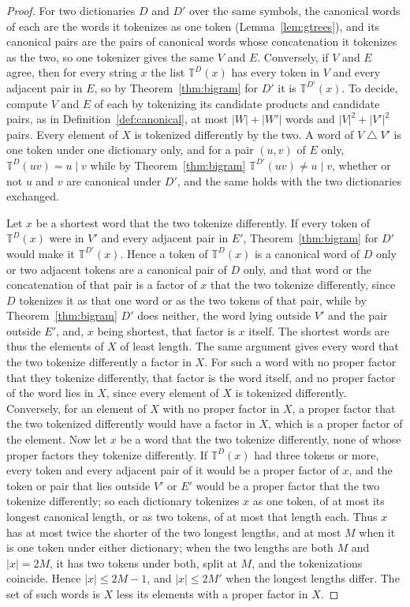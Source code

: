 \documentclass[11pt,a4paper]{article}
\theoremstyle{definition}
\theoremstyle{plain}
\newcommand{\T}{\mathbb{T}}
\begin{document}
\begin{proof}
For two dictionaries \(D\) and \(D'\) over the same symbols, the canonical words of each are the words it tokenizes as
one token (Lemma~\ref{lem:gtrees}), and its canonical pairs are the pairs of canonical words whose concatenation it
tokenizes as the two, so one tokenizer gives the same \(V\) and \(E\). Conversely, if \(V\) and \(E\) agree, then for
every string \(x\) the list \(\T^D(x)\) has every token in \(V\) and every adjacent pair in \(E\), so by
Theorem~\ref{thm:bigram} for \(D'\) it is \(\T^{D'}(x)\). To decide, compute \(V\) and \(E\) of each by tokenizing its
candidate products and candidate pairs, as in Definition~\ref{def:canonical}, at most \(|W| + |W'|\) words and
\(|V|^2 + |V'|^2\) pairs. Every element of \(X\) is tokenized differently by the two. A word of
\(V \mathbin{\triangle} V'\) is one token under one dictionary only, and for a pair \((u, v)\) of \(E\) only,
\(\T^D(uv) = u \mid v\) while by Theorem~\ref{thm:bigram} \(\T^{D'}(uv) \ne u \mid v\), whether or not \(u\) and \(v\)
are canonical under \(D'\), and the same holds with the two dictionaries exchanged.

Let \(x\) be a shortest word that the two tokenize differently. If every token of \(\T^D(x)\) were in \(V'\) and every
adjacent pair in \(E'\), Theorem~\ref{thm:bigram} for \(D'\) would make it \(\T^{D'}(x)\). Hence a token of \(\T^D(x)\)
is a canonical word of \(D\) only or two adjacent tokens are a canonical pair of \(D\) only, and that word or the
concatenation of that pair is a factor of \(x\) that the two tokenize differently, since \(D\) tokenizes it as that one
word or as the two tokens of that pair, while by Theorem~\ref{thm:bigram} \(D'\) does neither, the word lying outside
\(V'\) and the pair outside \(E'\), and, \(x\) being shortest, that factor is \(x\) itself. The shortest words are thus
the elements of \(X\) of least length. The same argument gives every word that the two tokenize differently a factor in
\(X\). For such a word with no proper factor that they tokenize differently, that factor is the word itself, and no
proper factor of the word lies in \(X\), since every element of \(X\) is tokenized differently. Conversely, for an
element of \(X\) with no proper factor in \(X\), a proper factor that the two tokenized differently would have a factor
in \(X\), which is a proper factor of the element. Now let \(x\) be a word that the two tokenize differently, none of
whose proper factors they tokenize differently. If \(\T^D(x)\) had three tokens or more, every token and every adjacent
pair of it would be a proper factor of \(x\), and the token or pair that lies outside \(V'\) or \(E'\) would be a proper
factor that the two tokenize differently; so each dictionary tokenizes \(x\) as one token, of at most its longest
canonical length, or as two tokens, of at most that length each. Thus \(x\) has at most twice the shorter of the two
longest lengths, and at most \(M\) when it is one token under either dictionary; when the two lengths are both \(M\) and
\(|x| = 2M\), it has two tokens under both, split at \(M\), and the tokenizations coincide. Hence \(|x| \le 2M - 1\),
and \(|x| \le 2M'\) when the longest lengths differ. The set of such words is \(X\) less its elements with a proper
factor in \(X\).


\end{proof}
\end{document}
